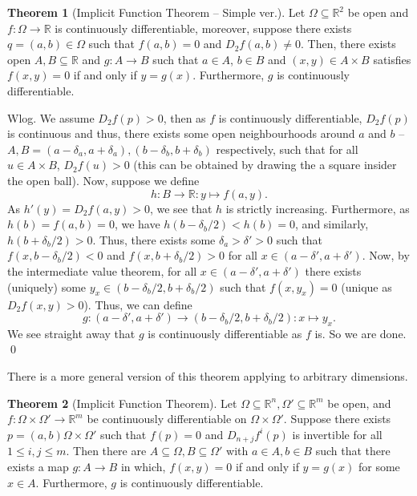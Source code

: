 \documentclass[
]{article}
\theoremstyle{definition}
\newtheorem{theorem}{Theorem}
\theoremstyle{definition}
\begin{document}
\begin{theorem}[Implicit Function Theorem -- Simple ver.]
  Let \(\Omega \subseteq \mathbb{R}^2\) be open and \(f : \Omega \to \mathbb{R}\) 
  is continuously differentiable, moreover, suppose there exists 
  \(q = (a, b) \in \Omega\) such that \(f(a, b) = 0\) and \(D_2 f(a, b) \neq 0\). 
  Then, there exists open \(A, B \subseteq \mathbb{R}\) and \(g : A \to B\)
   such that \(a \in A\), \(b \in B\) and \((x, y) \in A \times B\) satisfies 
   \(f(x, y) = 0\) if and only if \(y = g(x)\). Furthermore, \(g\) is 
   continuously differentiable.
\end{theorem}

\proof

Wlog. We assume \(D_2f(p) > 0\), then as \(f\) is continuously
differentiable, \(D_2f(p)\) is continuous and thus, there exists some
open neighbourhoods around \(a\) and \(b\) --
\(A, B = (a - \delta_a, a + \delta_a), (b - \delta_b, b + \delta_b)\)
respectively, such that for all \(u \in A \times B\), \(D_2f(u) > 0\)
(this can be obtained by drawing the a square insider the open ball).
Now, suppose we define \[h : B \to \mathbb{R} : y \mapsto f(a, y).\] As
\(h'(y) = D_2f(a, y) > 0\), we see that \(h\) is strictly increasing.
Furthermore, as \(h(b) = f(a, b) = 0\), we have
\(h(b - \delta_b / 2) < h(b) = 0\), and similarly,
\(h(b + \delta_b / 2) > 0\). Thus, there exists some
\(\delta_a > \delta' > 0\) such that \(f(x, b - \delta_b / 2) < 0\) and
\(f(x, b + \delta_b / 2) > 0\) for all
\(x \in (a - \delta', a + \delta')\). Now, by the intermediate value
theorem, for all \(x \in (a - \delta', a + \delta')\) there exists
(uniquely) some \(y_x \in (b - \delta_b / 2, b + \delta_b / 2)\) such
that \(f(x, y_x) = 0\) (unique as \(D_2f(x, y) > 0\)). Thus, we can
define
\[g : (a - \delta', a + \delta') \to (b - \delta_b / 2, b + \delta_b / 2) : x \mapsto y_x.\]
We see straight away that \(g\) is continuously differentiable as \(f\)
is. So we are done. \qed

There is a more general version of this theorem applying to arbitrary
dimensions.

\begin{theorem}[Implicit Function Theorem]
  Let \(\Omega \subseteq \mathbb{R}^n, \Omega' \subseteq \mathbb{R}^m\) be open, 
  and \(f : \Omega \times \Omega' \to \mathbb{R}^m\) be continuously differentiable 
  on \(\Omega \times \Omega'\). Suppose there exists 
  \(p = (a, b) \Omega \times \Omega'\) such that \(f(p) = 0\) and 
  \(D_{n + j} f^i(p)\) is invertible for all \(1 \le i, j \le m\). Then there 
  are \(A \subseteq \Omega, B \subseteq \Omega'\) with \(a \in A, b \in B\) 
  such that there exists a map \(g : A \to B\) in which, 
  \(f(x, y) = 0\) if and only if \(y = g(x)\) for some \(x \in A\).
  Furthermore, \(g\) is continuously differentiable.
\end{theorem}
\end{document}
